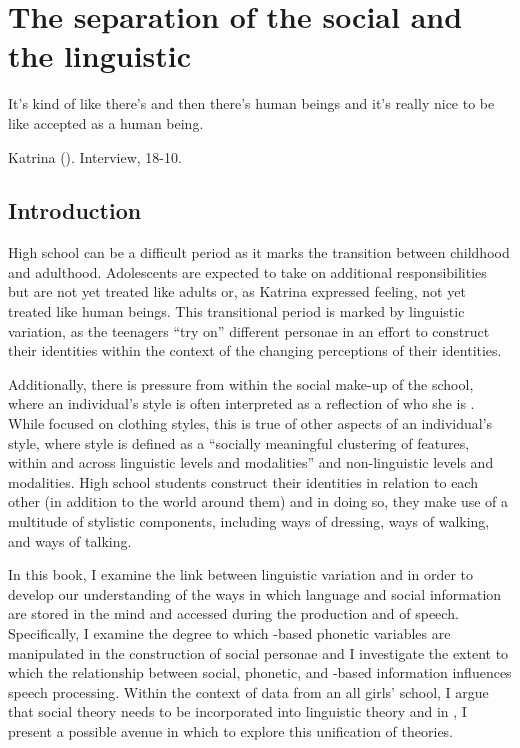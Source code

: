 \chapter{The separation of the social and the linguistic}
\label{ch:litrev}

\epigraph{It's kind of like there's  and then there's human beings and it's really nice to be like accepted as a human being.}{Katrina (). Interview, 18-10.}


\section{Introduction}

High school can be a difficult period as it marks the transition between childhood and adulthood. Adolescents are expected to take on additional responsibilities but are not yet treated like adults or, as Katrina expressed feeling, not yet treated like human beings. This transitional period is marked by linguistic variation, as the teenagers ``try on'' different personae in an effort to construct their identities within the context of the changing perceptions of their identities.

Additionally, there is pressure from within the social make-up of the school, where an individual's style is often interpreted as a reflection of who she is \citep[2]{pomerantz2008}. While \citet{pomerantz2008} focused on clothing styles, this is true of other aspects of an individual's style, where style is defined as a ``socially meaningful clustering of features, within and across linguistic levels and modalities'' \citep{campbellkibleretal2006} and non-linguistic levels and modalities. High school students construct their identities in relation to each other (in addition to the world around them) and in doing so, they make use of a multitude of stylistic components, including ways of dressing, ways of walking, and ways of talking. 

In this book, I examine the link between linguistic variation and  in order to develop our understanding of the ways in which language and social information are stored in the mind and accessed during the production and  of speech. Specifically, I examine the degree to which -based phonetic variables are manipulated in the construction of social personae and I investigate the extent to which the relationship between social, phonetic, and -based information influences speech processing. Within the context of data from an all girls' school, I argue that social theory needs to be incorporated into linguistic theory and in , I present a possible avenue in which to explore this unification of theories.

